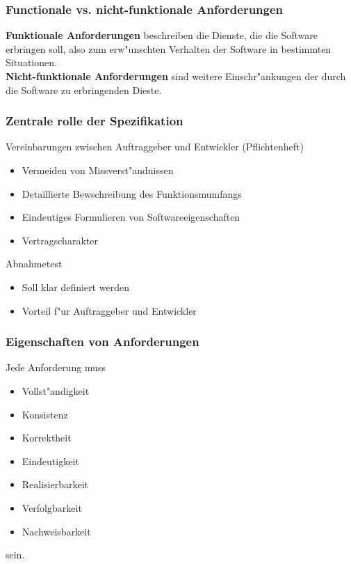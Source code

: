 \subsubsection{Functionale vs. nicht-funktionale Anforderungen}

\textbf{Funktionale Anforderungen} beschreiben die Dienste, die die Software erbringen soll, also zum erw"unschten Verhalten der Software in bestimmten Situationen.\\
\textbf{Nicht-funktionale Anforderungen} sind weitere Einschr"ankungen der durch die Software zu erbringenden Dieste.



\subsubsection{Zentrale rolle der Spezifikation}
Vereinbarungen zwischen Auftraggeber und Entwickler (Pflichtenheft)
\begin{itemize}
    \item Vermeiden von Missverst"andnissen
    \item Detaillierte Bewschreibung des Funktionsmumfangs
    \item Eindeutiges Formulieren von Softwareeigenschaften
    \item Vertragscharakter
\end{itemize}

Abnahmetest
\begin{itemize}
    \item Soll klar definiert werden
    \item Vorteil f"ur Auftraggeber und Entwickler
\end{itemize}

\subsubsection{Eigenschaften von Anforderungen}
Jede Anforderung muss
\begin{itemize}
    \item Vollst"andigkeit
    \item Konsistenz
    \item Korrektheit
    \item Eindeutigkeit
    \item Realisierbarkeit
    \item Verfolgbarkeit
    \item Nachweisbarkeit
\end{itemize}
sein.\\

